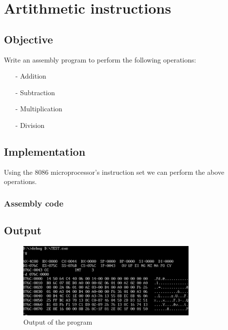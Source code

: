 \section{Artithmetic instructions}

\subsection{Objective}

Write an assembly program to perform the following operations:

\begin{itemize}
    \item[-] Addition
    \item[-] Subtraction
    \item[-] Multiplication
    \item[-] Division
\end{itemize}

\subsection{Implementation}

Using the 8086 microprocessor's instruction set we can perform the above operations.

\subsubsection{Assembly code}


\subsection{Output}

\begin{figure}[ht]
    \centering
    \includegraphics[width=0.8\textwidth]{./res/practicals/arithmetic.png}
    \caption{Output of the program}
    \label{fig:arithmetic_instructions}
\end{figure}

\pagebreak
